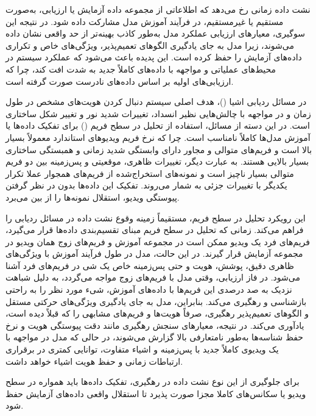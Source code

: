 \documentclass{article}
\begin{document}
نشت داده زمانی رخ می‌دهد که اطلاعاتی از مجموعه داده آزمایش یا ارزیابی، به‌صورت مستقیم یا غیرمستقیم، در فرآیند آموزش مدل مشارکت داده شود. در نتیجه این سوگیری، معیارهای ارزیابی عملکرد مدل به‌طور کاذب بهینه‌تر از حد واقعی نشان داده می‌شوند، زیرا مدل به جای یادگیری الگوهای تعمیم‌پذیر، ویژگی‌های خاص و تکراری داده‌های آزمایش را حفظ کرده است. این پدیده باعث می‌شود که عملکرد سیستم در محیط‌های عملیاتی و مواجهه با داده‌های کاملاً جدید به شدت افت کند، چرا که ارزیابی‌های اولیه بر اساس داده‌های نادرست صورت گرفته است.

در مسائل ردیابی اشیا ()، هدف اصلی سیستم دنبال کردن هویت‌های مشخص در طول زمان و در مواجهه با چالش‌هایی نظیر انسداد، تغییرات شدید نور و تغییر شکل ساختاری است. در این دسته از مسائل، استفاده از تحلیل در سطح فریم () برای تفکیک داده‌ها یا آموزش مدل‌ها کاملاً نامناسب است. چرا که نرخ فریم ویدیوهای استاندارد معمولاً بسیار بالا است و فریم‌های متوالی و مجاور دارای وابستگی شدید زمانی و همبستگی ساختاری بسیار بالایی هستند. به عبارت دیگر، تغییرات ظاهری، موقعیتی و پس‌زمینه بین دو فریم متوالی بسیار ناچیز است و نمونه‌های استخراج‌شده از فریم‌های همجوار عملا تکرار یکدیگر با تغییرات جزئی به شمار می‌روند. تفکیک این داده‌ها بدون در نظر گرفتن پیوستگی ویدیو، استقلال نمونه‌ها را از بین می‌برد.

این رویکرد تحلیل در سطح فریم، مستقیماً زمینه‌ وقوع نشت داده‌ در مسائل ردیابی را فراهم می‌کند. زمانی که تحلیل در سطح فریم مبنای تقسیم‌بندی داده‌ها قرار می‌گیرد، فریم‌های فرد یک ویدیو ممکن است در مجموعه آموزش و فریم‌های زوج همان ویدیو در مجموعه آزمایش قرار گیرند. در این حالت، مدل در طول فرآیند آموزش با ویژگی‌های ظاهری دقیق، پوشش، هویت و حتی پس‌زمینه خاص یک شی در فریم‌های فرد آشنا می‌شود. در فاز ارزیابی، وقتی مدل با فریم‌های زوج مواجه می‌گردد، به دلیل شباهت نزدیک به صد درصدی این فریم‌ها با داده‌های آموزش، شیء مورد نظر را به راحتی بازشناسی و رهگیری می‌کند. بنابراین، مدل به جای یادگیری ویژگی‌های حرکتی مستقل و الگوهای تعمیم‌پذیر رهگیری، صرفاً هویت‌ها و فریم‌های مشابهی را که قبلاً دیده است، یادآوری می‌کند. در نتیجه، معیارهای سنجش رهگیری مانند دقت پیوستگی هویت و نرخ حفظ شناسه‌ها به‌طور نامتعارفی بالا گزارش می‌شوند، در حالی که مدل در مواجهه با یک ویدیوی کاملاً جدید با پس‌زمینه و اشیاء متفاوت، توانایی کمتری در برقراری ارتباطات زمانی و حفظ هویت اشیاء خواهد داشت. 

برای جلوگیری از این نوع نشت داده در رهگیری، تفکیک داده‌ها باید همواره در سطح ویدیو یا سکانس‌های کاملا مجزا صورت پذیرد تا استقلال واقعی داده‌های آزمایش حفظ شود.

\end{document}
